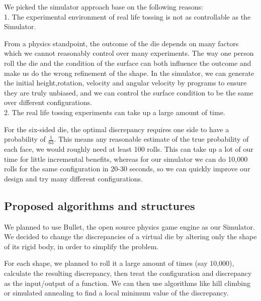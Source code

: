 We picked the simulator approach base on the following reasons:\\

1. The experimental environment of real life tossing is not as controllable as the Simulator.

From a physics standpoint, the outcome of the die depends on many factors which we cannot reasonably control over many experiments. The way one person roll the die and the condition of the surface can both influence the outcome and make us do the wrong refinement of the shape. In the simulator, we can generate the initial height,rotation, velocity and angular velocity by programs to ensure they are truly unbiased, and we can control the surface condition to be the same over different configurations.\\

2. The real life tossing experiments can take up a large amount of time.

For the six-sided die, the optimal discrepancy requires one side to have a probability of ${\frac{1}{63}}$. This means any reasonable estimate of the true probability of each face, we would roughly need at least 100 rolls. This can take up a lot of our time for little incremental benefits, whereas for our simulator we can do 10,000 rolls for the same configuration in 20-30 seconds, so we can quickly improve our design and try many different configurations.

\subsection{Proposed algorithms and structures}
We planned to use Bullet, the open source physics game engine as our Simulator. We decided to change the discrepancies of a virtual die by altering only the shape of its rigid body, in order to simplify the problem.

For each shape, we planned to roll it a large amount of times (say 10,000), calculate the resulting discrepancy, then treat the configuration and discrepancy as the input/output of a function. We can then use algorithms like hill climbing or simulated annealing to find a local minimum value of the discrepancy.
